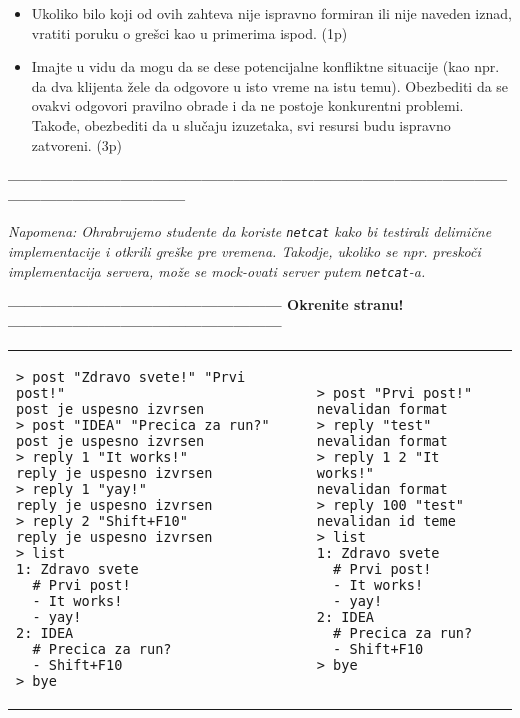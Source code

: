\documentclass[]{article}
\begin{document}
\begin{enumerate}
\begin{itemize}
\begin{itemize}
  \end{itemize}
  \item Ukoliko bilo koji od ovih zahteva nije ispravno formiran ili nije naveden iznad, vratiti poruku o gre\v{s}ci kao u primerima ispod. \hfill(1p)
  \item Imajte u vidu da mogu da se dese potencijalne konfliktne situacije (kao npr. da dva klijenta žele da odgovore u isto vreme na istu temu). Obezbediti da se ovakvi odgovori pravilno obrade i da ne postoje konkurentni problemi. Takođe, obezbediti da u slučaju izuzetaka, svi resursi budu ispravno zatvoreni. \hfill (3p)
\end{itemize}

\vspace{15pt}
\begin{center}
  \textbf{------------------------------------------------------------------------------------------------------------------------------}
\end{center}
\textit{Napomena: Ohrabrujemo studente da koriste \texttt{netcat} kako bi testirali delimi\v{c}ne implementacije i otkrili gre\v{s}ke pre vremena. Takodje, ukoliko se npr. presko\v{c}i implementacija servera, mo\v{z}e se mock-ovati server putem \texttt{netcat}-a.} 
\begin{center}
  \textbf{--------------------------------------------------- Okrenite stranu! ---------------------------------------------------}
\end{center}
\newpage

\noindent
\begin{tabular}{ll}
\begin{lstlisting}
> post "Zdravo svete!" "Prvi post!"
post je uspesno izvrsen
> post "IDEA" "Precica za run?"
post je uspesno izvrsen
> reply 1 "It works!"
reply je uspesno izvrsen
> reply 1 "yay!"
reply je uspesno izvrsen
> reply 2 "Shift+F10"
reply je uspesno izvrsen
> list
1: Zdravo svete
  # Prvi post!
  - It works!
  - yay!
2: IDEA
  # Precica za run?
  - Shift+F10
> bye
\end{lstlisting}&
\begin{lstlisting}
> post "Prvi post!"
nevalidan format
> reply "test"
nevalidan format
> reply 1 2 "It works!"
nevalidan format
> reply 100 "test"
nevalidan id teme
> list
1: Zdravo svete
  # Prvi post!
  - It works!
  - yay!
2: IDEA
  # Precica za run?
  - Shift+F10
> bye
\end{lstlisting}
\end{tabular}


\end{enumerate}
\end{document}
